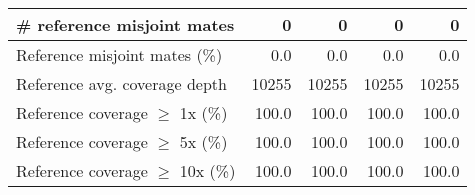 \documentclass[12pt,a4paper]{article}
\begin{document}
\begin{table}[ht]
\begin{center}
\begin{tabular}{|l*{4}{|r}|}
\# reference misjoint mates & 0 & 0 & 0 & 0 \\ \hline
Reference misjoint mates (\%) & 0.0 & 0.0 & 0.0 & 0.0 \\ \hline
Reference avg. coverage depth & 10255 & 10255 & 10255 & 10255 \\ \hline
Reference coverage $\geq$ 1x (\%) & 100.0 & 100.0 & 100.0 & 100.0 \\ \hline
Reference coverage $\geq$ 5x (\%) & 100.0 & 100.0 & 100.0 & 100.0 \\ \hline
Reference coverage $\geq$ 10x (\%) & 100.0 & 100.0 & 100.0 & 100.0 \\ \hline
\end{tabular}
\end{center}
\end{table}
\end{document}

